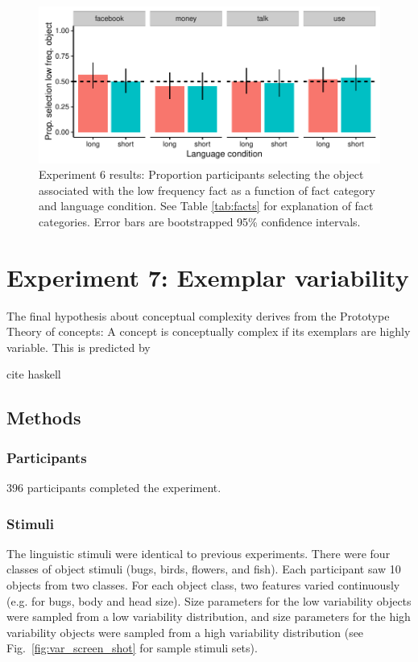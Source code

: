   \begin{figure}
 \begin{center}
  \includegraphics[width=6in]{figs/fact_plots.pdf}
  \caption{\label{fig:fact_plots} Experiment 6 results: Proportion participants selecting the object associated with the low frequency fact as a function of fact category and language condition. See Table \ref{tab:facts} for explanation of fact categories. Error bars are bootstrapped 95\% confidence intervals.}
 \end{center}
\end{figure}

\section{Experiment 7: Exemplar variability}
The final hypothesis about conceptual complexity derives from the Prototype Theory of concepts: A concept is conceptually complex if its exemplars are highly variable. This is predicted by 

cite haskell

\subsection{Methods}
\subsubsection{Participants}

396 participants completed the experiment.

\subsubsection{Stimuli} 
The linguistic stimuli were identical to previous experiments. There were four classes of object stimuli (bugs, birds, flowers, and fish). Each participant saw 10 objects from two classes. For each object class, two features varied continuously (e.g. for bugs, body and head size). Size parameters for the low variability objects were  sampled from a low variability distribution, and size parameters for the high variability objects were  sampled from a high variability distribution (see Fig.\ \ref{fig:var_screen_shot} for sample stimuli sets).

